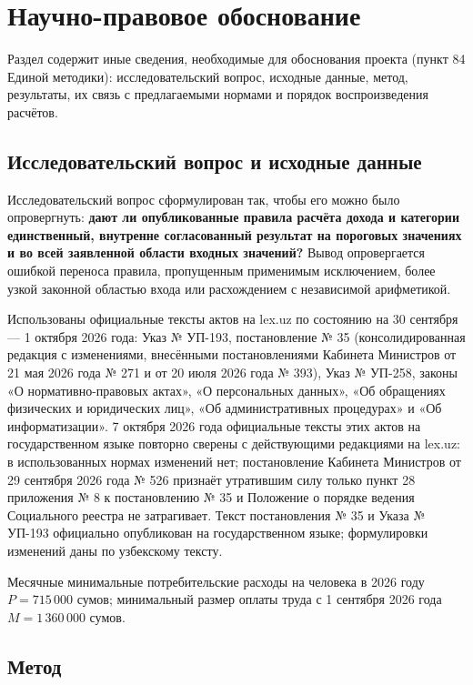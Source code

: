 \documentclass[14pt,a4paper]{extarticle}
\begin{document}
\section{Научно-правовое обоснование}\label{sec:sci}
Раздел содержит иные сведения, необходимые для обоснования проекта (пункт 84 Единой методики): исследовательский вопрос, исходные данные, метод, результаты, их связь с предлагаемыми нормами и порядок воспроизведения расчётов.

\subsection{Исследовательский вопрос и исходные данные}
Исследовательский вопрос сформулирован так, чтобы его можно было опровергнуть: \textbf{дают ли опубликованные правила расчёта дохода и категории единственный, внутренне согласованный результат на пороговых значениях и во всей заявленной области входных значений?} Вывод опровергается ошибкой переноса правила, пропущенным применимым исключением, более узкой законной областью входа или расхождением с независимой арифметикой.

Использованы официальные тексты актов на lex.uz по состоянию на 30 сентября — 1 октября 2026 года: Указ № УП-193, постановление № 35 (консолидированная редакция с изменениями, внесёнными постановлениями Кабинета Министров от 21 мая 2026 года № 271 и от 20 июля 2026 года № 393), Указ № УП-258, законы «О нормативно-правовых актах», «О персональных данных», «Об обращениях физических и юридических лиц», «Об административных процедурах» и «Об информатизации»\cite{pf193,res35,pf258,orq682,pdlaw,appeals,apl,inform}. 7 октября 2026 года официальные тексты этих актов на государственном языке повторно сверены с действующими редакциями на lex.uz: в использованных нормах изменений нет; постановление Кабинета Министров от 29 сентября 2026 года № 526 признаёт утратившим силу только пункт 28 приложения № 8 к постановлению № 35 и Положение о порядке ведения Социального реестра не затрагивает. Текст постановления № 35 и Указа № УП-193 официально опубликован на государственном языке; формулировки изменений даны по узбекскому тексту.

Месячные минимальные потребительские расходы на человека в 2026 году $P=715\,000$ сумов\cite{mpr}; минимальный размер оплаты труда с 1 сентября 2026 года $M=1\,360\,000$ сумов\cite{mrot}.

\subsection{Метод}
\end{document}
